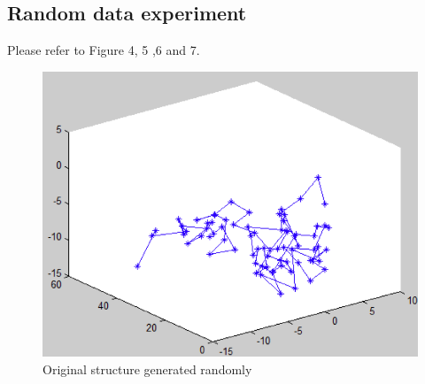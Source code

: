 \documentclass[12pt]{article} %
\begin{document}
\subsection{Random data experiment}
	Please refer to Figure 4, 5 ,6 and 7.
	\begin{figure}[ht]\centering
		\includegraphics[scale=0.3]{Figure_4}
		\caption{Original structure generated randomly}
	\end{figure}
\end{document}
